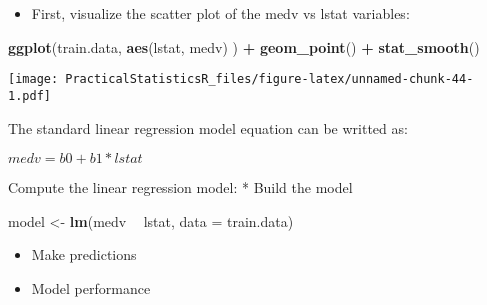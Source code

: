 \documentclass[]{article}
\newenvironment{Shaded}{\begin{snugshade}}{\end{snugshade}}
\newcommand{\DataTypeTok}[1]{\textcolor[rgb]{0.13,0.29,0.53}{#1}}
\newcommand{\KeywordTok}[1]{\textcolor[rgb]{0.13,0.29,0.53}{\textbf{#1}}}
\newcommand{\NormalTok}[1]{#1}
\newcommand{\OperatorTok}[1]{\textcolor[rgb]{0.81,0.36,0.00}{\textbf{#1}}}
\newcommand{\StringTok}[1]{\textcolor[rgb]{0.31,0.60,0.02}{#1}}
\providecommand{\tightlist}{%
  \setlength{\itemsep}{0pt}\setlength{\parskip}{0pt}}
\begin{document}
\begin{itemize}
\tightlist
\item
  First, visualize the scatter plot of the medv vs lstat variables:
\end{itemize}

\begin{Shaded}
\begin{Highlighting}[]
\KeywordTok{ggplot}\NormalTok{(train.data, }\KeywordTok{aes}\NormalTok{(lstat, medv) ) }\OperatorTok{+}
\StringTok{  }\KeywordTok{geom_point}\NormalTok{() }\OperatorTok{+}
\StringTok{  }\KeywordTok{stat_smooth}\NormalTok{()}
\end{Highlighting}
\end{Shaded}

\texttt{[image: PracticalStatisticsR\_files/figure-latex/unnamed-chunk-44-1.pdf]}

The standard linear regression model equation can be writted as:

\(medv = b0+b1*lstat\)

Compute the linear regression model: * Build the model

\begin{Shaded}
\begin{Highlighting}[]
\NormalTok{model <-}\StringTok{ }\KeywordTok{lm}\NormalTok{(medv }\OperatorTok{~}\StringTok{ }\NormalTok{lstat, }\DataTypeTok{data =}\NormalTok{ train.data)}
\end{Highlighting}
\end{Shaded}

\begin{itemize}
\tightlist
\item
  Make predictions
\end{itemize}

\begin{Shaded}
\end{Shaded}

\begin{itemize}
\tightlist
\item
  Model performance
\end{itemize}

\begin{Shaded}
\end{Shaded}
\end{document}
